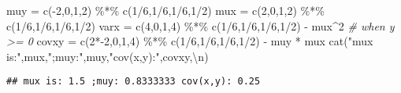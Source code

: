 \documentclass[
]{article}
\newenvironment{Shaded}{\begin{snugshade}}{\end{snugshade}}
\newcommand{\CommentTok}[1]{\textcolor[rgb]{0.56,0.35,0.01}{\textit{#1}}}
\newcommand{\DecValTok}[1]{\textcolor[rgb]{0.00,0.00,0.81}{#1}}
\newcommand{\FunctionTok}[1]{\textcolor[rgb]{0.00,0.00,0.00}{#1}}
\newcommand{\NormalTok}[1]{#1}
\newcommand{\OtherTok}[1]{\textcolor[rgb]{0.56,0.35,0.01}{#1}}
\newcommand{\SpecialCharTok}[1]{\textcolor[rgb]{0.00,0.00,0.00}{#1}}
\newcommand{\StringTok}[1]{\textcolor[rgb]{0.31,0.60,0.02}{#1}}
\begin{document}
\begin{Shaded}
\begin{Highlighting}[]
\NormalTok{muy }\OtherTok{=} \FunctionTok{c}\NormalTok{(}\SpecialCharTok{{-}}\DecValTok{2}\NormalTok{,}\DecValTok{0}\NormalTok{,}\DecValTok{1}\NormalTok{,}\DecValTok{2}\NormalTok{) }\SpecialCharTok{\%*\%} \FunctionTok{c}\NormalTok{(}\DecValTok{1}\SpecialCharTok{/}\DecValTok{6}\NormalTok{,}\DecValTok{1}\SpecialCharTok{/}\DecValTok{6}\NormalTok{,}\DecValTok{1}\SpecialCharTok{/}\DecValTok{6}\NormalTok{,}\DecValTok{1}\SpecialCharTok{/}\DecValTok{2}\NormalTok{)}
\NormalTok{mux }\OtherTok{=} \FunctionTok{c}\NormalTok{(}\DecValTok{2}\NormalTok{,}\DecValTok{0}\NormalTok{,}\DecValTok{1}\NormalTok{,}\DecValTok{2}\NormalTok{) }\SpecialCharTok{\%*\%} \FunctionTok{c}\NormalTok{(}\DecValTok{1}\SpecialCharTok{/}\DecValTok{6}\NormalTok{,}\DecValTok{1}\SpecialCharTok{/}\DecValTok{6}\NormalTok{,}\DecValTok{1}\SpecialCharTok{/}\DecValTok{6}\NormalTok{,}\DecValTok{1}\SpecialCharTok{/}\DecValTok{2}\NormalTok{)}
\NormalTok{varx }\OtherTok{=} \FunctionTok{c}\NormalTok{(}\DecValTok{4}\NormalTok{,}\DecValTok{0}\NormalTok{,}\DecValTok{1}\NormalTok{,}\DecValTok{4}\NormalTok{) }\SpecialCharTok{\%*\%} \FunctionTok{c}\NormalTok{(}\DecValTok{1}\SpecialCharTok{/}\DecValTok{6}\NormalTok{,}\DecValTok{1}\SpecialCharTok{/}\DecValTok{6}\NormalTok{,}\DecValTok{1}\SpecialCharTok{/}\DecValTok{6}\NormalTok{,}\DecValTok{1}\SpecialCharTok{/}\DecValTok{2}\NormalTok{) }\SpecialCharTok{{-}}\NormalTok{ mux}\SpecialCharTok{\^{}}\DecValTok{2}
\CommentTok{\# when y \textgreater{}= 0}
\NormalTok{covxy }\OtherTok{=} \FunctionTok{c}\NormalTok{(}\DecValTok{2}\SpecialCharTok{*{-}}\DecValTok{2}\NormalTok{,}\DecValTok{0}\NormalTok{,}\DecValTok{1}\NormalTok{,}\DecValTok{4}\NormalTok{) }\SpecialCharTok{\%*\%} \FunctionTok{c}\NormalTok{(}\DecValTok{1}\SpecialCharTok{/}\DecValTok{6}\NormalTok{,}\DecValTok{1}\SpecialCharTok{/}\DecValTok{6}\NormalTok{,}\DecValTok{1}\SpecialCharTok{/}\DecValTok{6}\NormalTok{,}\DecValTok{1}\SpecialCharTok{/}\DecValTok{2}\NormalTok{) }\SpecialCharTok{{-}}\NormalTok{ muy }\SpecialCharTok{*}\NormalTok{ mux}
\FunctionTok{cat}\NormalTok{(}\StringTok{"mux is:"}\NormalTok{,mux,}\StringTok{";muy:"}\NormalTok{,muy,}\StringTok{"cov(x,y):"}\NormalTok{,covxy,}\StringTok{\textquotesingle{}}\SpecialCharTok{\textbackslash{}n}\StringTok{\textquotesingle{}}\NormalTok{)}
\end{Highlighting}
\end{Shaded}

\begin{verbatim}
## mux is: 1.5 ;muy: 0.8333333 cov(x,y): 0.25
\end{verbatim}
\end{document}
